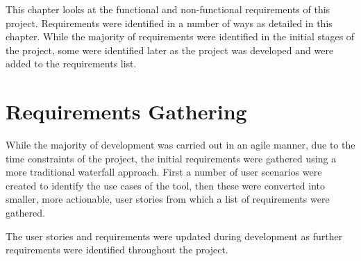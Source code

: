 \documentclass[l4proj.tex]{subfiles}
\begin{document}
    

This chapter looks at the functional and non-functional requirements of this project. Requirements were identified in a number of ways as detailed in this chapter. While the majority of requirements were identified in the initial stages of the project, some were identified later as the project was developed and were added to the requirements list.

\section{Requirements Gathering}
While the majority of development was carried out in an agile manner, due to the time constraints of the project, the initial requirements were gathered using a more traditional waterfall approach. First a number of user scenarios were created to identify the use cases of the tool, then these were converted into smaller, more actionable, user stories from which a list of requirements were gathered. 

The user stories and requirements were updated during development as further requirements were identified throughout the project.
 
\end{document}
